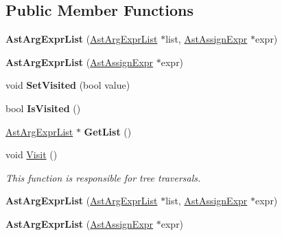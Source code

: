 \subsection*{Public Member Functions}
\begin{DoxyCompactItemize}
\item 
\hypertarget{classAstArgExprList_a6aafae6eaadd5db52a33768136657610}{{\bfseries Ast\-Arg\-Expr\-List} (\hyperlink{classAstArgExprList}{Ast\-Arg\-Expr\-List} $\ast$list, \hyperlink{classAstAssignExpr}{Ast\-Assign\-Expr} $\ast$expr)}\label{classAstArgExprList_a6aafae6eaadd5db52a33768136657610}

\item 
\hypertarget{classAstArgExprList_a4acc4d03bbbe66b9a19e991d21169414}{{\bfseries Ast\-Arg\-Expr\-List} (\hyperlink{classAstAssignExpr}{Ast\-Assign\-Expr} $\ast$expr)}\label{classAstArgExprList_a4acc4d03bbbe66b9a19e991d21169414}

\item 
\hypertarget{classAstArgExprList_a373feb9ea4fdef7d6eede9be2a673ac9}{void {\bfseries Set\-Visited} (bool value)}\label{classAstArgExprList_a373feb9ea4fdef7d6eede9be2a673ac9}

\item 
\hypertarget{classAstArgExprList_a6be96ce331bf80a8ffd2314eab2fd8bf}{bool {\bfseries Is\-Visited} ()}\label{classAstArgExprList_a6be96ce331bf80a8ffd2314eab2fd8bf}

\item 
\hypertarget{classAstArgExprList_a07413ac154eea5ed2c43d83865b128e2}{\hyperlink{classAstArgExprList}{Ast\-Arg\-Expr\-List} $\ast$ {\bfseries Get\-List} ()}\label{classAstArgExprList_a07413ac154eea5ed2c43d83865b128e2}

\item 
void \hyperlink{classAstArgExprList_aeac192a90197b0de59114cea84a1e577}{Visit} ()
\begin{DoxyCompactList}\small\item\em This function is responsible for tree traversals. \end{DoxyCompactList}\item 
\hypertarget{classAstArgExprList_a6aafae6eaadd5db52a33768136657610}{{\bfseries Ast\-Arg\-Expr\-List} (\hyperlink{classAstArgExprList}{Ast\-Arg\-Expr\-List} $\ast$list, \hyperlink{classAstAssignExpr}{Ast\-Assign\-Expr} $\ast$expr)}\label{classAstArgExprList_a6aafae6eaadd5db52a33768136657610}

\item 
\hypertarget{classAstArgExprList_a4acc4d03bbbe66b9a19e991d21169414}{{\bfseries Ast\-Arg\-Expr\-List} (\hyperlink{classAstAssignExpr}{Ast\-Assign\-Expr} $\ast$expr)}\label{classAstArgExprList_a4acc4d03bbbe66b9a19e991d21169414}


\end{DoxyCompactItemize}
